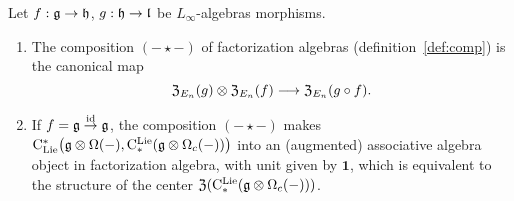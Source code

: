 \documentclass[11pt]{amsart}
\numberwithin{equation}{section}
\begin{document}
\begin{thm}\label{T:compcentralizer}
 Let $f: \mathfrak g \to \mathfrak h$, $g: \mathfrak h \to \mathfrak l$ be  $L_\infty$-algebras morphisms.
\begin{enumerate} \item 
 The composition $(-\star-)$ of factorization algebras (definition~\ref{def:comp}) 
 is the canonical map 
\[{\frak Z}_{E_n}(g) \otimes {\frak Z}_{E_n}(f) \longrightarrow {\frak Z}_{E_n}(g\circ f).\] 
\item If $f= \mathfrak g \stackrel{{\rm id}}\to \mathfrak g$,  the composition $(-\star-)$ makes 
${\rm C}_{\rm Lie}^*\big(\mathfrak g \otimes \Omega(-), {\rm C}^{\rm Lie}_*(\mathfrak g \otimes \Omega_c(-)) \big)$ into an 
(augmented) associative algebra object in factorization algebra, with unit given by $\mathbf{1}$, 
which is equivalent to the structure of the center ${\frak Z} ({\rm C}^{\rm Lie}_*(\mathfrak g \otimes \Omega_c(-)))$. 
\end{enumerate}
\end{thm}
\end{document}
